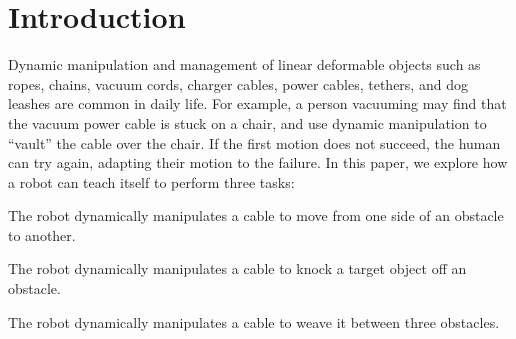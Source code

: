 \section{Introduction}

Dynamic manipulation and management of linear deformable objects such as ropes, chains, vacuum cords, charger cables, power cables, tethers, and dog leashes are common in daily life. For example, a person vacuuming may find that the vacuum power cable is stuck on a chair, and use dynamic manipulation to ``vault'' the cable over the chair. If the first motion does not succeed, the human can try again, adapting their motion to the failure.  In this paper, we explore how a robot can teach itself to perform three tasks:

\begin{description}[align=left,leftmargin=0pt]
    \item[Task 1: Vaulting] The robot dynamically manipulates a cable to move from one side of an obstacle to another. %
    \item[Task 2: Knocking] The robot dynamically manipulates a cable to knock a target object off an obstacle. %
    \item[Task 3: Weaving] The robot dynamically manipulates a cable to weave it between three obstacles. %
\end{description} 

